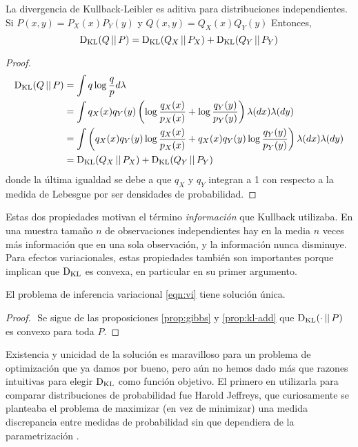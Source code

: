 \documentclass[main.tex]{subfiles}
\begin{document}
\begin{prop}[Aditividad]\label{prop:kl-add}
	La divergencia de Kullback-Leibler es aditiva para distribuciones 
	independientes. Si $P(x, y)=P_X(x)P_Y(y)$ y $Q(x, y)=Q_X(x)Q_Y(y)$ 
	 Entonces, 
	\begin{equation*}
		\operatorname*{D_{KL}}(Q\operatorname*{\mid\mid} P) = \operatorname*{D_{KL}}(Q_X\operatorname*{\mid\mid} P_X) + \operatorname*{D_{KL}}(Q_Y\operatorname*{\mid\mid} P_Y)
	\end{equation*}
\end{prop}
\begin{proof}$ $ \newline
\begin{align*}
	\operatorname*{D_{KL}}(Q\operatorname*{\mid\mid} P) &= \int q\log\frac{q}{p}d\lambda \\
	&= \int q_X(x)q_Y(y)\left(\log\frac{q_X(x)}{p_X(x)}+\log\frac{q_Y(y)}{p_Y(y)}\right)\lambda(dx)\lambda(dy) \\
	&= \int \left(q_X(x)q_Y(y)\log\frac{q_X(x)}{p_X(x)} + q_X(x)q_Y(y)\log\frac{q_Y(y)}{p_Y(y)}\right)\lambda(dx)\lambda(dy) \\
	&= \operatorname*{D_{KL}}(Q_X\operatorname*{\mid\mid} P_X) + \operatorname*{D_{KL}}(Q_Y\operatorname*{\mid\mid} P_Y)
\end{align*}
donde la última igualdad se debe a que $q_X$ y $q_Y$ integran a 1 con respecto a
la medida de Lebesgue por ser densidades de probabilidad.
\end{proof}

Estas dos propiedades motivan el término \textit{información} que Kullback
utilizaba. En una muestra tamaño $n$ de observaciones independientes hay en la
media $n$ veces más información que en una sola observación, y la información
nunca disminuye. Para efectos variacionales, estas propiedades también son
importantes porque implican que $\operatorname*{D_{KL}}$ es convexa, en particular en su primer
argumento.

\begin{theorem}
	El problema de inferencia variacional \eqref{eqn:vi} tiene solución única. 
\end{theorem}
\begin{proof} $ $ \newline
	Se sigue de las proposiciones \ref{prop:gibbs} y \ref{prop:kl-add} que
	$\operatorname*{D_{KL}}(\cdot \operatorname*{\mid\mid} P)$ es convexo para toda $P$.
\end{proof}

Existencia y unicidad de la solución es maravilloso para un problema de
optimización que ya damos por bueno, pero aún no hemos dado más que razones
intuitivas para elegir $\operatorname*{D_{KL}}$ como función objetivo. El primero en utilizarla
para comparar distribuciones de probabilidad fue Harold Jeffreys, que
curiosamente se planteaba el problema de maximizar (en vez de minimizar) una
medida discrepancia entre medidas de probabilidad sin que dependiera de la
parametrización \cite{jeffreys1946}. 
\end{document}
